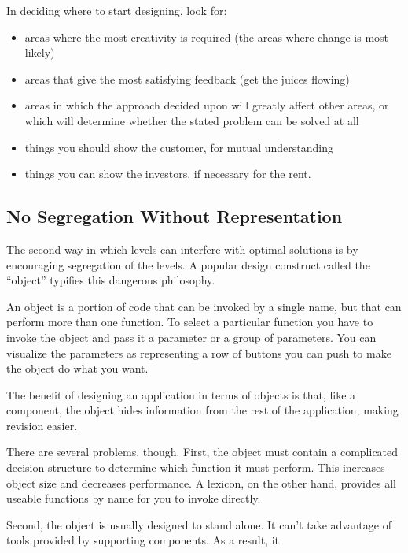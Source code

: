 \begin{tip}
In deciding where to start designing, look for:

\begin{itemize}
	\item areas where the most creativity is required (the areas where change is most likely)
	\item areas that give the most satisfying feedback (get the juices flowing)
	\item areas in which the approach decided upon will greatly affect other areas, or which will determine whether the stated problem can be solved at all
	\item things you should show the customer, for mutual understanding
	\item things you can show the investors, if necessary for the rent.
\end{itemize}
\end{tip}

\subsection{No Segregation Without Representation}

The second way in which levels can interfere with optimal solutions is by
encouraging segregation of the levels. A popular design construct called
the ``object'' typifies this dangerous philosophy.

An object is a portion of code that can be invoked by a single name,
but that can perform more than one function. To select a particular
function you have to invoke the object and pass it a parameter or a
group of parameters. You can visualize the parameters as representing
a row of buttons you can push to make the object do what you want.

The benefit of designing an application in terms of objects is that,
like a component, the object hides information from the rest of the
application, making revision easier.

There are several problems, though. First, the object must contain a
complicated decision structure to determine which function it must
perform. This increases object size and decreases performance. A
lexicon, on the other hand, provides all useable functions by name for
you to invoke directly.

Second, the object is usually designed to stand alone. It can't take
advantage of tools provided by supporting components. As a result, it

